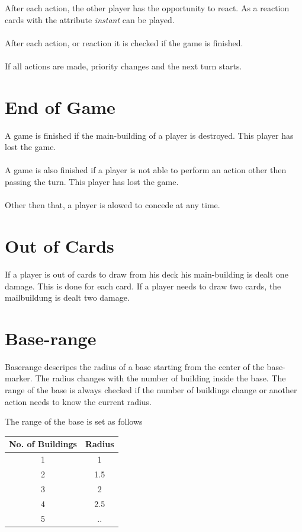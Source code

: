 \documentclass[a5paper,pagesize,10pt,bibtotoc,pointlessnumbers,
normalheadings,DIV=9,twoside=false]{scrbook}
\begin{document}
After each action, the other player has the opportunity to react. As a reaction cards with the attribute \emph{instant} can be played.\\
\\
After each action, or reaction it is checked if the game is finished.\\
\\
If all actions are made, priority changes and the next turn starts.

\section{End of Game}
A game is finished if the main-building of a player is destroyed. This player has lost the game.\\
\\
A game is also finished if a player is not able to perform an action other then passing the turn. This player has lost the game.\\
\\
Other then that, a player is alowed to concede at any time.


\section{Out of Cards}
If a player is out of cards to draw from his deck his main-building is dealt one damage. This is done for each card.
If a player needs to draw two cards, the mailbuildung is dealt two damage.\\


\section{Base-range}
Baserange descripes the radius of a base starting from the center of the base-marker. The radius changes with the number of building inside the base.
The range of the base is always checked if the number of buildings change or another action needs to know the current radius.

The range of the base is set as follows

\begin{center}
 \begin{tabular}{||c c||} 
 \hline
 No. of Buildings & Radius\\
 \hline\hline
 1 & 1 \\ 
 \hline
 2 & 1.5 \\
 \hline
 3 & 2 \\
 \hline
 4 & 2.5\\
 \hline
 5 & .. \\
 \hline
\end{tabular}
\end{center}
\end{document}
